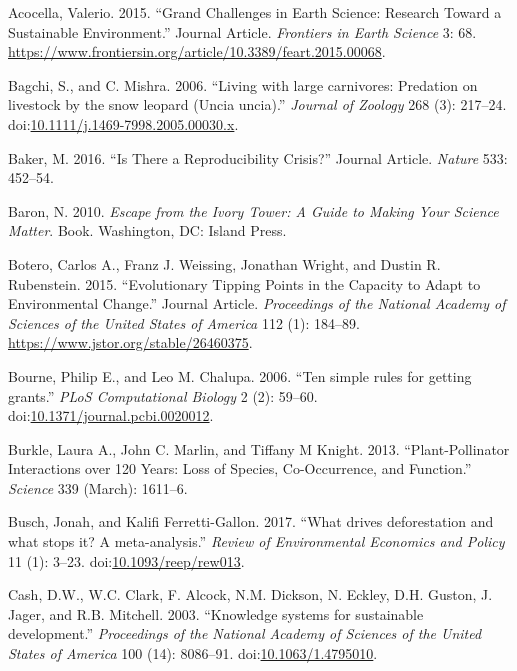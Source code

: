 \documentclass[fleqn,10pt]{wlpeerj} %
\begin{document}
\hypertarget{ref-Acocella2015}{}
Acocella, Valerio. 2015. ``Grand Challenges in Earth Science: Research
Toward a Sustainable Environment.'' Journal Article. \emph{Frontiers in
Earth Science} 3: 68.
\url{https://www.frontiersin.org/article/10.3389/feart.2015.00068}.

\hypertarget{ref-Bagchi2006}{}
Bagchi, S., and C. Mishra. 2006. ``Living with large carnivores:
Predation on livestock by the snow leopard (Uncia uncia).''
\emph{Journal of Zoology} 268 (3): 217--24.
doi:\href{https://doi.org/10.1111/j.1469-7998.2005.00030.x}{10.1111/j.1469-7998.2005.00030.x}.

\hypertarget{ref-Baker2016}{}
Baker, M. 2016. ``Is There a Reproducibility Crisis?'' Journal Article.
\emph{Nature} 533: 452--54.

\hypertarget{ref-Baron2010}{}
Baron, N. 2010. \emph{Escape from the Ivory Tower: A Guide to Making
Your Science Matter}. Book. Washington, DC: Island Press.

\hypertarget{ref-Botero2015}{}
Botero, Carlos A., Franz J. Weissing, Jonathan Wright, and Dustin R.
Rubenstein. 2015. ``Evolutionary Tipping Points in the Capacity to Adapt
to Environmental Change.'' Journal Article. \emph{Proceedings of the
National Academy of Sciences of the United States of America} 112 (1):
184--89. \url{https://www.jstor.org/stable/26460375}.

\hypertarget{ref-Bourne2006}{}
Bourne, Philip E., and Leo M. Chalupa. 2006. ``Ten simple rules for
getting grants.'' \emph{PLoS Computational Biology} 2 (2): 59--60.
doi:\href{https://doi.org/10.1371/journal.pcbi.0020012}{10.1371/journal.pcbi.0020012}.

\hypertarget{ref-Burkle2013}{}
Burkle, Laura A., John C. Marlin, and Tiffany M Knight. 2013.
``Plant-Pollinator Interactions over 120 Years: Loss of Species,
Co-Occurrence, and Function.'' \emph{Science} 339 (March): 1611--6.

\hypertarget{ref-Busch2017}{}
Busch, Jonah, and Kalifi Ferretti-Gallon. 2017. ``What drives
deforestation and what stops it? A meta-analysis.'' \emph{Review of
Environmental Economics and Policy} 11 (1): 3--23.
doi:\href{https://doi.org/10.1093/reep/rew013}{10.1093/reep/rew013}.

\hypertarget{ref-Cash2003}{}
Cash, D.W., W.C. Clark, F. Alcock, N.M. Dickson, N. Eckley, D.H. Guston,
J. Jager, and R.B. Mitchell. 2003. ``Knowledge systems for sustainable
development.'' \emph{Proceedings of the National Academy of Sciences of
the United States of America} 100 (14): 8086--91.
doi:\href{https://doi.org/10.1063/1.4795010}{10.1063/1.4795010}.
\end{document}
